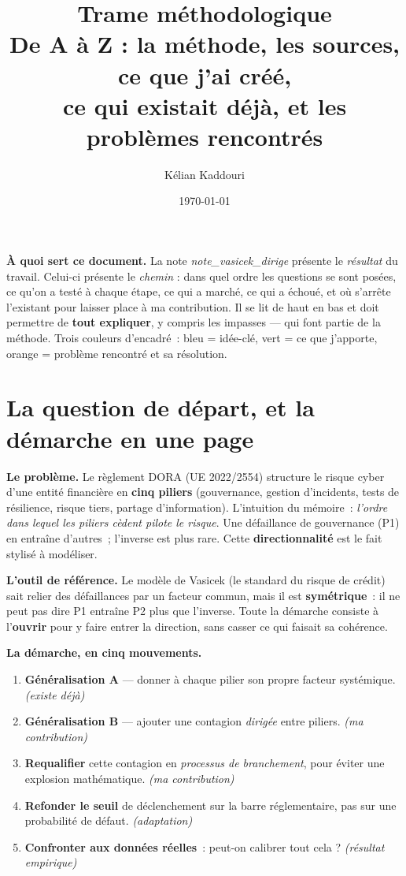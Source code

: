 \documentclass[11pt,a4paper]{article}
\title{\vspace{-1.2cm}\color{navy}\bfseries Trame méthodologique\\[2pt]
  \large De A à Z : la méthode, les sources, ce que j'ai créé,\\ce qui existait déjà, et les problèmes rencontrés}
\author{Kélian Kaddouri}
\date{\today}
\begin{document}
\maketitle
\vspace{-0.5cm}

\begin{cle}
\textbf{À quoi sert ce document.} La note \emph{note\_vasicek\_dirige} présente le
\emph{résultat} du travail. Celui-ci présente le \emph{chemin} : dans quel ordre les questions
se sont posées, ce qu'on a testé à chaque étape, ce qui a marché, ce qui a échoué, et où
s'arrête l'existant pour laisser place à ma contribution. Il se lit de haut en bas et doit
permettre de \textbf{tout expliquer}, y compris les impasses --- qui font partie de la méthode.
Trois couleurs d'encadré~: \colorbox{lightblue!60}{bleu} = idée-clé, \colorbox{lightgreen!80}{vert}
= ce que j'apporte, \colorbox{accent!15}{orange} = problème rencontré et sa résolution.
\end{cle}

\section{La question de départ, et la démarche en une page}

\textbf{Le problème.} Le règlement DORA (UE 2022/2554) structure le risque cyber d'une entité
financière en \textbf{cinq piliers} (gouvernance, gestion d'incidents, tests de résilience,
risque tiers, partage d'information). L'intuition du mémoire~: \emph{l'ordre dans lequel les
piliers cèdent pilote le risque}. Une défaillance de gouvernance (P1) en entraîne d'autres~;
l'inverse est plus rare. Cette \textbf{directionnalité} est le fait stylisé à modéliser.

\textbf{L'outil de référence.} Le modèle de Vasicek (le standard du risque de crédit) sait
relier des défaillances par un facteur commun, mais il est \textbf{symétrique}~: il ne peut pas
dire \og{}P1 entraîne P2 plus que l'inverse\fg{}. Toute la démarche consiste à l'\textbf{ouvrir}
pour y faire entrer la direction, sans casser ce qui faisait sa cohérence.

\textbf{La démarche, en cinq mouvements.}
\begin{enumerate}[leftmargin=1.6em,itemsep=1pt]
\item \textbf{Généralisation A} --- donner à chaque pilier son propre facteur systémique. \emph{(existe déjà)}
\item \textbf{Généralisation B} --- ajouter une contagion \emph{dirigée} entre piliers. \emph{(ma contribution)}
\item \textbf{Requalifier} cette contagion en \emph{processus de branchement}, pour éviter une explosion mathématique. \emph{(ma contribution)}
\item \textbf{Refonder le seuil} de déclenchement sur la barre réglementaire, pas sur une probabilité de défaut. \emph{(adaptation)}
\item \textbf{Confronter aux données réelles}~: peut-on calibrer tout cela ? \emph{(résultat empirique)}
\end{enumerate}
\end{document}
